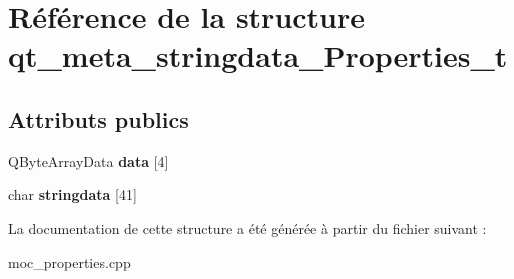 \hypertarget{structqt__meta__stringdata__Properties__t}{\section{Référence de la structure qt\+\_\+meta\+\_\+stringdata\+\_\+\+Properties\+\_\+t}
\label{structqt__meta__stringdata__Properties__t}
}
\subsection*{Attributs publics}
\begin{DoxyCompactItemize}
\item 
\hypertarget{structqt__meta__stringdata__Properties__t_afd8a50a37e01b90b69c73253207258d5}{Q\+Byte\+Array\+Data {\bfseries data} \mbox{[}4\mbox{]}}\label{structqt__meta__stringdata__Properties__t_afd8a50a37e01b90b69c73253207258d5}

\item 
\hypertarget{structqt__meta__stringdata__Properties__t_a51f839ee70ec536b04847965d1c6bf10}{char {\bfseries stringdata} \mbox{[}41\mbox{]}}\label{structqt__meta__stringdata__Properties__t_a51f839ee70ec536b04847965d1c6bf10}

\end{DoxyCompactItemize}


La documentation de cette structure a été générée à partir du fichier suivant \+:\begin{DoxyCompactItemize}
\item 
moc\+\_\+properties.\+cpp\end{DoxyCompactItemize}
